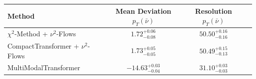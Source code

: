     \begin{tabular}{lccc}
        \toprule
        Method & Mean Deviation $p_{T}(\bar{\nu})$ & Resolution $p_{T}(\bar{\nu})$ \\
        \midrule
        $\chi^2$-Method + $\nu^2$-Flows & $1.72^{+0.06}_{-0.08}$ & $50.50^{+0.16}_{-0.16}$ \\
        CompactTransformer + $\nu^2$-Flows & $1.73^{+0.05}_{-0.05}$ & $50.49^{+0.15}_{-0.13}$ \\
        MultiModalTransformer & $-14.63^{+0.03}_{-0.04}$ & $31.10^{+0.03}_{-0.03}$ \\
        \bottomrule
    \end{tabular}